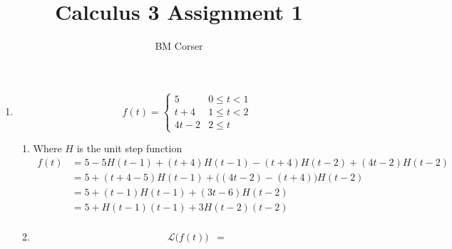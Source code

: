 \documentclass[10pt]{article}
\author{BM Corser}
\title{Calculus 3 Assignment 1}
\date{}
\begin{document}
    \maketitle 
    \begin{enumerate}
        \item
            $$
                f(t) =
                \begin{cases}
                    5 & 0 \le t < 1 \\
                    t + 4 & 1 \le t < 2 \\
                    4t - 2 & 2 \le t
                \end{cases}
            $$
        \begin{enumerate}
            \item Where $H$ is the unit step function
                \begin{align*}
                    f(t) &= 5 - 5H(t - 1) + (t + 4)H(t - 1) - (t + 4)H(t - 2) + (4t - 2)H(t - 2) \\
                         &= 5 + (t + 4 - 5)H(t - 1) + \Big((4t - 2) - (t + 4)\Big)H(t - 2) \\
                         &= 5 + (t - 1)H(t - 1) + (3t - 6)H(t - 2) \\
                         &= 5 + H(t - 1)(t - 1) + 3H(t - 2)(t - 2) \\
                \end{align*}
            \item 
                \begin{align*}
                    \mathcal{L}\Big(f(t)\Big) &= 
                \end{align*}
        \end{enumerate}
    \end{enumerate}
\end{document}
